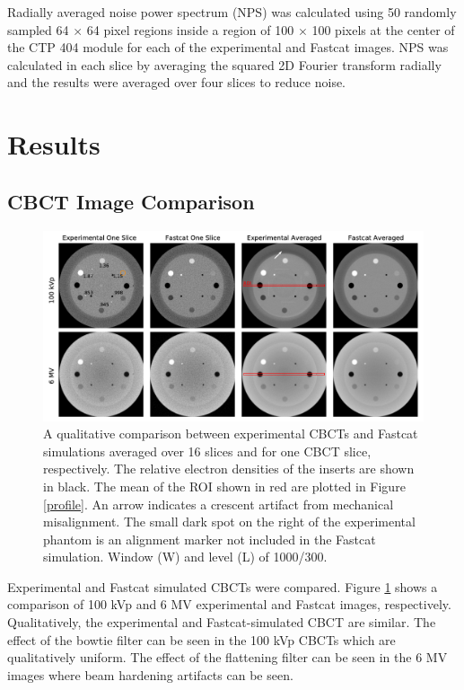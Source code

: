 Radially averaged noise power spectrum (NPS) was calculated using 50 randomly sampled 64 $\times$ 64 pixel regions inside a region of 100 $\times$ 100 pixels at the center of the CTP 404 module for each of the experimental and Fastcat images. NPS was calculated in each slice by averaging the squared 2D Fourier transform radially and the results were averaged over four slices to reduce noise.

\section{Results}

\subsection{CBCT Image Comparison}

\begin{figure}[ht!]
  \begin{center}
  \includegraphics[width=\textwidth, clip]{figures/all_cbcts.pdf}
  {A qualitative comparison between experimental CBCTs and Fastcat simulations averaged over 16 slices and for one CBCT slice, respectively. The relative electron densities of the inserts are shown in black. The mean of the ROI shown in red are plotted in Figure \ref{profile}. An arrow indicates a crescent artifact from mechanical misalignment. The small dark spot on the right of the experimental phantom is an alignment marker not included in the Fastcat simulation. Window (W) and level (L) of 1000/300. 
  \label{images} 
    }  %
    \end{center}
\end{figure}

Experimental and Fastcat simulated CBCTs were compared. Figure \ref{images} shows a comparison of 100 kVp and 6 MV experimental and Fastcat images, respectively. Qualitatively, the experimental and Fastcat-simulated CBCT are similar. The effect of the bowtie filter can be seen in the 100 kVp CBCTs which are qualitatively uniform. The effect of the flattening filter can be seen in the 6 MV images where beam hardening artifacts can be seen.


